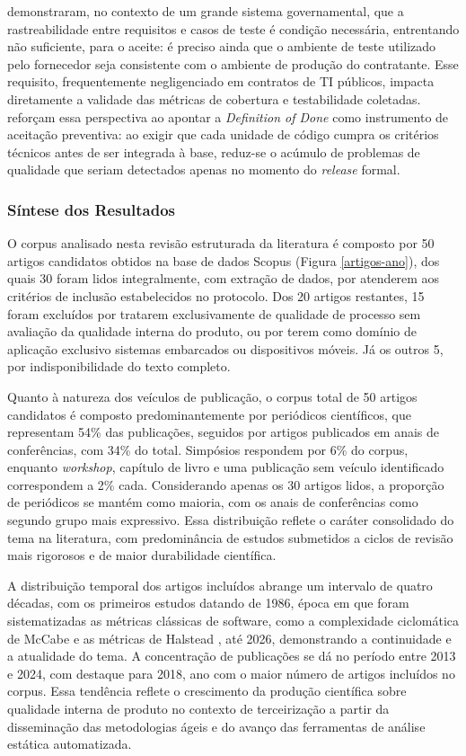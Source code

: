  demonstraram, no contexto de um grande sistema governamental, que a rastreabilidade entre requisitos e casos de teste é condição necessária, entrentando não suficiente, para o aceite: é preciso ainda que o ambiente de teste utilizado pelo fornecedor seja consistente com o ambiente de produção do contratante. Esse requisito, frequentemente negligenciado em contratos de TI públicos, impacta diretamente a validade das métricas de cobertura e testabilidade coletadas.  reforçam essa perspectiva ao apontar a \textit{Definition of Done} como instrumento de aceitação preventiva: ao exigir que cada unidade de código cumpra os critérios técnicos antes de ser integrada à base, reduz-se o acúmulo de problemas de qualidade que seriam detectados apenas no momento do \textit{release} formal.

\subsubsection{Síntese dos Resultados}

O corpus analisado nesta revisão estruturada da literatura é composto por 50 artigos candidatos obtidos na base de dados Scopus (Figura \ref{artigos-ano}), dos quais 30 foram lidos integralmente, com extração de dados, por atenderem aos critérios de inclusão estabelecidos no protocolo. Dos 20 artigos restantes, 15 foram excluídos por tratarem exclusivamente de qualidade de processo sem avaliação da qualidade interna do produto, ou por terem como domínio de aplicação exclusivo sistemas embarcados ou dispositivos móveis. Já os outros 5, por indisponibilidade do texto completo.

Quanto à natureza dos veículos de publicação, o corpus total de 50 artigos candidatos é composto predominantemente por periódicos científicos, que representam 54\% das publicações, seguidos por artigos publicados em anais de conferências, com 34\% do total. Simpósios respondem por 6\% do corpus, enquanto \textit{workshop}, capítulo de livro e uma publicação sem veículo identificado correspondem a 2\% cada. Considerando apenas os 30 artigos lidos, a proporção de periódicos se mantém como maioria, com os anais de conferências como segundo grupo mais expressivo. Essa distribuição reflete o caráter consolidado do tema na literatura, com predominância de estudos submetidos a ciclos de revisão mais rigorosos e de maior durabilidade científica.

A distribuição temporal dos artigos incluídos abrange um intervalo de quatro décadas, com os primeiros estudos datando de 1986, época em que foram sistematizadas as métricas clássicas de software, como a complexidade ciclomática de McCabe e as métricas de Halstead \cite{swebok1986tools}, até 2026, demonstrando a continuidade e a atualidade do tema. A concentração de publicações se dá no período entre 2013 e 2024, com destaque para 2018, ano com o maior número de artigos incluídos no corpus. Essa tendência reflete o crescimento da produção científica sobre qualidade interna de produto no contexto de terceirização a partir da disseminação das metodologias ágeis e do avanço das ferramentas de análise estática automatizada.

